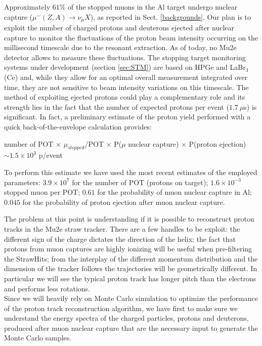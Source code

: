 \documentclass[12pt,a4paper,openright, oneside, titlepage]{book} %
\begin{document}
\vspace{0.5cm}

\noindent
Approximately $61\%$ of the stopped muons in the Al target undergo nuclear capture ($\mu^-(Z,A)\rightarrow \nu_\mu X$), as reported in Sect. \ref{backgrounds}. 
Our plan is to exploit the number of charged protons and deuterons ejected after nuclear capture to monitor the fluctuations of the proton beam intensity occurring on the millisecond timescale due to the resonant extraction. 
As of today, no Mu2e detector allows to measure these fluctuations.
The stopping target monitoring systems under development (section \ref{sec:STM}) are based on HPGe and LaBr$_3$(Ce) and, while they allow for an optimal overall measurement integrated over time, they are not sensitive to beam intensity variations on this timescale. 
The method of exploiting ejected protons could play a complementary role and its strength lies in the fact that the number of expected protons per event ($1.7\ \mu$s) is significant. 
In fact, a preliminary estimate of the proton yield performed with a quick back-of-the-envelope calculation provides:

\begin{center}
\begin{footnotesize}
number of POT $\times$ $\mu_{stopped}$/POT $\times$ P($\mu$ nuclear capture) $\times$ P(proton ejection) $\sim 1.5\times10^3$ p/event
\end{footnotesize}
\end{center}
To perform this estimate we have used the most recent estimates of the employed parameters: 
$3.9\times10^7$ for the number of POT (protons on target); 
$1.6\times10^{-3}$ stopped muon per POT; 
$0.61$ for the probability of muon nuclear capture in Al; 
$0.045$ for the probability of proton ejection after muon nuclear capture.

\noindent
The problem at this point is understanding if it is possible to reconstruct proton tracks in the Mu2e straw tracker.
There are a few handles to be exploit: the different sign of the charge dictates the direction of the helix; the fact that protons from muon captures are highly ionizing will be useful when pre-filtering the StrawHits; from the interplay of the different momentum distribution and the dimension of the tracker follows the trajectories will be geometrically different.
In particular we will see the typical proton track  has longer pitch than the electrons and performs less rotations.\\
Since we will heavily rely on Monte Carlo simulation to optimize the performance of the proton track reconstruction algorithm, we have first to make sure we understand the energy spectra of the charged particles, protons and deuterons, produced after muon nuclear capture that are the necessary input to generate the Monte Carlo samples.\\
\end{document}
